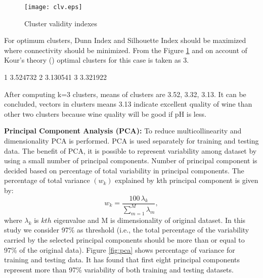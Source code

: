 \documentclass[12pt]{article}
\begin{document}
\begin{figure} [htbp]
 \begin{center}
\texttt{[image: clv.eps]}
\caption{Cluster validity indexes}
 \label{fig:cluster0}
\end{center}
\end{figure}

For optimum clusters, Dunn Index and Silhouette Index should be maximized where connectivity should be minimized.
From the Figure \ref{fig:cluster0} and on account of Kour's theory (\cite{Kour}) optimal clusters for this case is taken as 3.
\begin{Schunk}
\end{Schunk}

\begin{Schunk}
\begin{Soutput}
      [,1]
1 3.524732
2 3.130541
3 3.321922
\end{Soutput}
\end{Schunk}


After computing k=3 clusters, means of clusters are 3.52, 3.32, 3.13. It can be concluded, vectors in clusters
means 3.13 indicate excellent quality of wine than other two clusters because wine quality will be good if
pH is less.

\textbf{Principal Component Analysis (PCA):}
To reduce multicollinearity and dimensionality PCA is performed. PCA is used separately for training and testing
data. The benefit of PCA, it is possible to represent variability among dataset by using a small number of
principal components.  Number of principal component is decided based on percentage of total variability in
principal components. The percentage of total variance $(w_k)$ explained by kth principal component is given by:
$$w_k=\frac{100\,\lambda_k}{\sum_{m=1}^{M}\lambda_m},$$
where $\lambda_k$ is $kth$ eigenvalue and M is dimensionality of original dataset.
 In this study we consider 97\% as threshold (i.e., the total percentage of the variability carried by the
 selected principal components should be more than or equal to 97\% of the original data). Figure \ref{fig:pca}
 shows percentage of variance for training and testing data. It has found that first
 eight principal components represent more than 97\% variability of both training and testing datasets.
\end{document}
